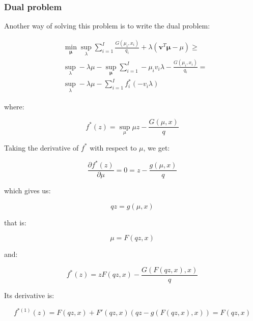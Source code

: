 \documentclass{tex/note}
\begin{document}
\subsubsection{Dual problem}

Another way of solving this problem is to write the dual problem:

\begin{align*}
& \min_{\bm{\mu}} \sup_{\lambda} \sum_{i = 1}^I \frac{G \left( \mu_i , x_i \right)}{q_i} + \lambda \left( \bm{v}^T \bm{\mu} - \mu \right) \geq \\
& \sup_{\lambda} - \lambda \mu - \sup_{\bm{\mu}} \sum_{i = 1}^I - \mu_i v_i \lambda - \frac{G \left( \mu_i , x_i \right)}{q_i} = \\
& \sup_{\lambda} - \lambda \mu - \sum_{i = 1}^I f_i^* \left( - v_i \lambda \right)
\end{align*}

where:

\begin{equation*}
f^* \left( z \right) = \sup_{\mu} \mu z - \frac{G \left( \mu , x \right)}{q}
\end{equation*}

Taking the derivative of $f^*$ with respect to $\mu$, we get:

\begin{equation*}
\frac{\partial f^* \left( z \right)}{\partial \mu} = 0 = z - \frac{g \left( \mu , x \right)}{q}
\end{equation*}

which gives us:

\begin{equation*}
q z = g \left( \mu , x \right)
\end{equation*}

that is:

\begin{equation*}
\mu = F \left( q z , x \right)
\end{equation*}

and:

\begin{equation*}
f^* \left( z \right) = z F \left( q z , x \right) - \frac{G \left( F \left( q z , x \right) , x \right)}{q}
\end{equation*}

Its derivative is:

\begin{equation*}
f^{* \left( 1 \right)} \left( z \right) = F \left( q z , x \right) + F' \left( q z , x \right) \left( q z - g \left( F \left( q z , x \right) , x \right) \right) = F \left( q z , x \right)
\end{equation*}
\end{document}
